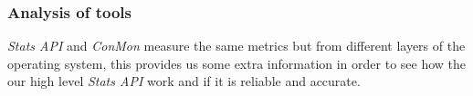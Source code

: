 %




\subsubsection{Analysis of tools}

{\it Stats API} and {\it ConMon} measure the same metrics but from different layers of the operating system, this provides us some extra information in order to see how the our high level {\it Stats API} work and if it is reliable and accurate.

